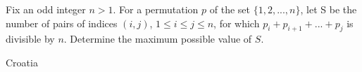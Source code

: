 Fix an odd integer $n > 1$. For a permutation $p$ of the set $\{1,2,...,n\}$, let S be the number of pairs of indices $(i, j)$, $1 \le i \le  j \le  n$, for which $p_i +p_{i+1} +...+p_j$ is divisible by $n$. Determine the maximum possible value of $S$.

Croatia